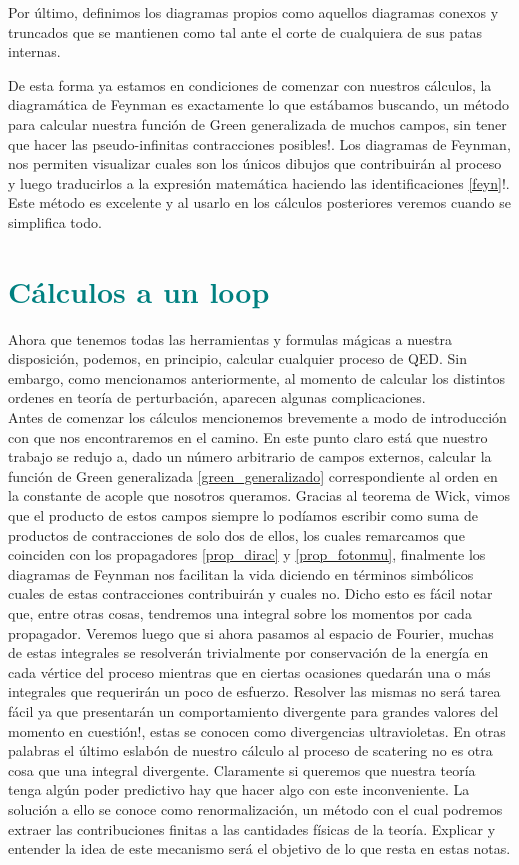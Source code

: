 \documentclass[tickz]{article}
\numberwithin{equation}{section}
\begin{document}
Por último, definimos los diagramas propios como aquellos diagramas conexos y truncados que se mantienen como tal ante el corte de cualquiera de sus patas internas.

De esta forma ya estamos en condiciones de comenzar con nuestros cálculos, la diagramática de Feynman es exactamente lo que estábamos buscando, un método para calcular nuestra función de Green generalizada
de muchos campos, sin tener que hacer las pseudo-infinitas contracciones
posibles!. Los diagramas de Feynman, nos permiten visualizar cuales
son los únicos dibujos que contribuirán al proceso y luego traducirlos
a la expresión matemática haciendo las identificaciones \ref{feyn}!. Este
método es excelente y al usarlo en los cálculos posteriores veremos
cuando se simplifica todo.

\section{\textcolor{teal}{Cálculos a un loop}}

Ahora que tenemos todas las herramientas y formulas mágicas a nuestra
disposición, podemos, en principio, calcular cualquier proceso de
QED. Sin embargo, como mencionamos anteriormente, al momento de calcular
los distintos ordenes en teoría de perturbación, aparecen algunas complicaciones.\\

Antes de comenzar los cálculos mencionemos brevemente a modo de introducción con que nos encontraremos en el camino. En este punto claro está que nuestro trabajo se redujo a, dado un número arbitrario de campos externos, calcular la función de Green generalizada \ref{green_generalizado} correspondiente al orden en la constante de acople que nosotros queramos. Gracias al teorema de Wick, vimos que el producto de estos campos siempre lo podíamos escribir como suma de productos de contracciones de solo dos de ellos, los cuales remarcamos que coinciden con los propagadores \ref{prop_dirac} y \ref{prop_fotonmu}, finalmente los diagramas de Feynman nos facilitan la vida diciendo en términos simbólicos cuales de estas contracciones contribuirán y cuales no. 
Dicho esto es fácil notar que, entre otras cosas, tendremos una integral sobre los momentos por cada propagador. Veremos luego que si ahora pasamos al espacio de Fourier, muchas de estas integrales se resolverán trivialmente por conservación de la energía en cada vértice del proceso mientras que en ciertas ocasiones quedarán una o más integrales que requerirán un poco de esfuerzo. Resolver las mismas no será tarea fácil ya que presentarán un comportamiento divergente para grandes valores del momento en cuestión!, estas se conocen como divergencias ultravioletas. En otras palabras el último eslabón de nuestro cálculo al proceso de scatering no es otra cosa que una integral divergente. Claramente si queremos que nuestra teoría tenga algún poder predictivo hay que hacer algo con este inconveniente. La solución a ello se conoce como renormalización, un método con el cual podremos extraer las contribuciones finitas a las cantidades físicas de la teoría. Explicar y entender la idea de este mecanismo será el objetivo de lo que resta en estas notas.
\end{document}
